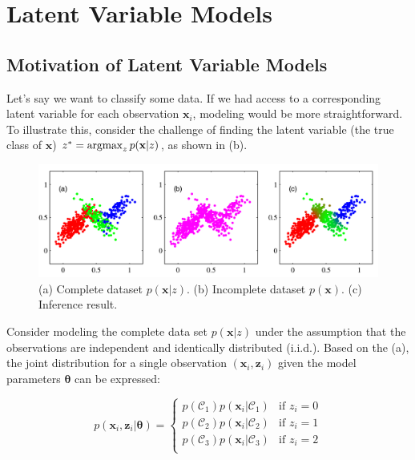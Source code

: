 \chapter{Latent Variable Models}
\section{Motivation of Latent Variable Models}
\label{sec:intro_motivation}

Let's say we want to classify some data. If we had access to a corresponding latent variable for each observation \( \mathbf{x}_i \), modeling would be more straightforward. To illustrate this, consider the challenge of finding the latent variable (\ie the true class of \( \mathbf{x} \)) \( z^* = \operatorname*{\operatorname{argmax}}_{z} p(\mathbf{x} | z) \), as shown in (b).

\begin{figure}[h]
	\begin{center}			
		\includegraphics[scale=0.25]{./images/generative/latent.png}
	\end{center}
	\caption{(a) Complete dataset \( p(\mathbf{x} | z) \). (b) Incomplete dataset \( p(\mathbf{x}) \). (c) Inference result.}
	\label{fig:clusters}
\end{figure}

Consider modeling the complete data set \( p(\mathbf{x} | z) \) under the assumption that the observations are independent and identically distributed (i.i.d.). Based on the (a), the joint distribution for a single observation \( (\mathbf{x}_i, \mathbf{z}_i) \) given the model parameters \( \boldsymbol{\theta} \) can be expressed:

\[
p(\mathbf{x}_i, \mathbf{z}_i | \boldsymbol{\theta}) = 
\begin{cases}
p(\mathcal{C}_1) p(\mathbf{x}_i | \mathcal{C}_1) & \text{if } z_i = 0 \\
p(\mathcal{C}_2) p(\mathbf{x}_i | \mathcal{C}_2) & \text{if } z_i = 1 \\
p(\mathcal{C}_3) p(\mathbf{x}_i | \mathcal{C}_3) & \text{if } z_i = 2 \\
\end{cases}
\]

